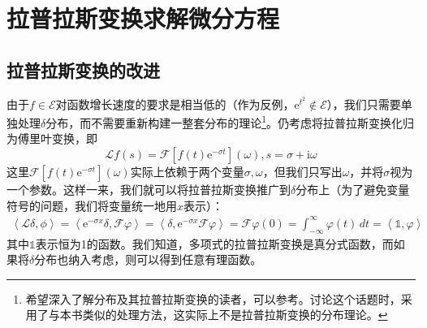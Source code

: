 \documentclass{ctexbook}
\begin{document}

\section{拉普拉斯变换求解微分方程}\label{sec:Laplace_ODE}

\subsection{拉普拉斯变换的改进}\label{sub:improvement_of_laplace}

由于$f\in\mathcal{E}$对函数增长速度的要求是相当低的（作为反例，$\mathrm{e}^{t^2}\notin\mathcal{E}$），我们只需要单独处理$\delta$分布，而不需要重新构建一整套分布的理论\footnote{希望深入了解分布及其拉普拉斯变换的读者，可以参考\cite{Laplace_Distribution}。\cite{distribution}讨论这个话题时，采用了与本书类似的处理方法，这实际上不是拉普拉斯变换的分布理论。}。仍考虑将拉普拉斯变换化归为傅里叶变换，即
\[\mathcal{L} f(s)=\mathcal{F} [f(t)\mathrm{e}^{-\sigma t}](\omega),s=\sigma+\mathrm{i}\omega\]
这里$\mathcal{F} [f(t)\mathrm{e}^{-\sigma t}](\omega)$实际上依赖于两个变量$\sigma,\omega$，但我们只写出$\omega$，并将$\sigma$视为一个参数\cite{distribution}。这样一来，我们就可以将拉普拉斯变换推广到$\delta$分布上（为了避免变量符号的问题，我们将变量统一地用$x$表示）：
\begin{align*}
    \left\langle \mathcal{L}\delta,\phi\right\rangle=\left\langle \mathrm{e}^{-\sigma x}\delta,\mathcal{F} \varphi\right\rangle=\left\langle \delta,\mathrm{e}^{-\sigma x}\mathcal{F} \varphi\right\rangle=\mathcal{F}\varphi(0)=\int_{-\infty}^{\infty}\varphi(t)\,dt=\left\langle \mathds{1},\varphi\right\rangle
\end{align*}
其中$\mathds{1}$表示恒为1的函数。我们知道，多项式的拉普拉斯变换是真分式函数，而如果将$\delta$分布也纳入考虑，则可以得到任意有理函数。
\end{document}
